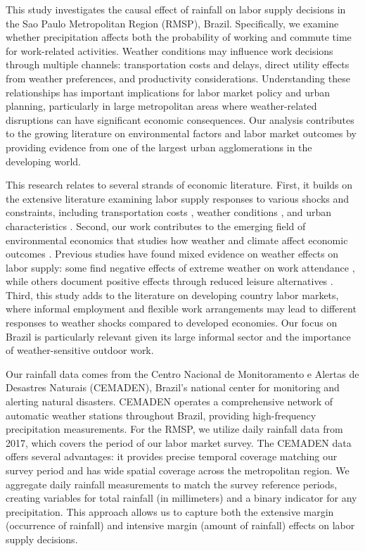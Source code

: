 This study investigates the causal effect of rainfall on labor supply decisions in the Sao Paulo Metropolitan Region (RMSP), Brazil. Specifically, we examine whether precipitation affects both the probability of working and commute time for work-related activities. Weather conditions may influence work decisions through multiple channels: transportation costs and delays, direct utility effects from weather preferences, and productivity considerations. Understanding these relationships has important implications for labor market policy and urban planning, particularly in large metropolitan areas where weather-related disruptions can have significant economic consequences. Our analysis contributes to the growing literature on environmental factors and labor market outcomes by providing evidence from one of the largest urban agglomerations in the developing world.

This research relates to several strands of economic literature. First, it builds on the extensive literature examining labor supply responses to various shocks and constraints, including transportation costs \citep{zenou2009urban}, weather conditions \citep{connolly2008here}, and urban characteristics \citep{moretti2011local}. Second, our work contributes to the emerging field of environmental economics that studies how weather and climate affect economic outcomes \citep{hsiang2016climate}. Previous studies have found mixed evidence on weather effects on labor supply: some find negative effects of extreme weather on work attendance \citep{lee2016temperature}, while others document positive effects through reduced leisure alternatives \citep{connolly2008here}. Third, this study adds to the literature on developing country labor markets, where informal employment and flexible work arrangements may lead to different responses to weather shocks compared to developed economies. Our focus on Brazil is particularly relevant given its large informal sector and the importance of weather-sensitive outdoor work.

Our rainfall data comes from the Centro Nacional de Monitoramento e Alertas de Desastres Naturais (CEMADEN), Brazil's national center for monitoring and alerting natural disasters. CEMADEN operates a comprehensive network of automatic weather stations throughout Brazil, providing high-frequency precipitation measurements. For the RMSP, we utilize daily rainfall data from 2017, which covers the period of our labor market survey. The CEMADEN data offers several advantages: it provides precise temporal coverage matching our survey period and has wide spatial coverage across the metropolitan region. We aggregate daily rainfall measurements to match the survey reference periods, creating variables for total rainfall (in millimeters) and a binary indicator for any precipitation. This approach allows us to capture both the extensive margin (occurrence of rainfall) and intensive margin (amount of rainfall) effects on labor supply decisions.

